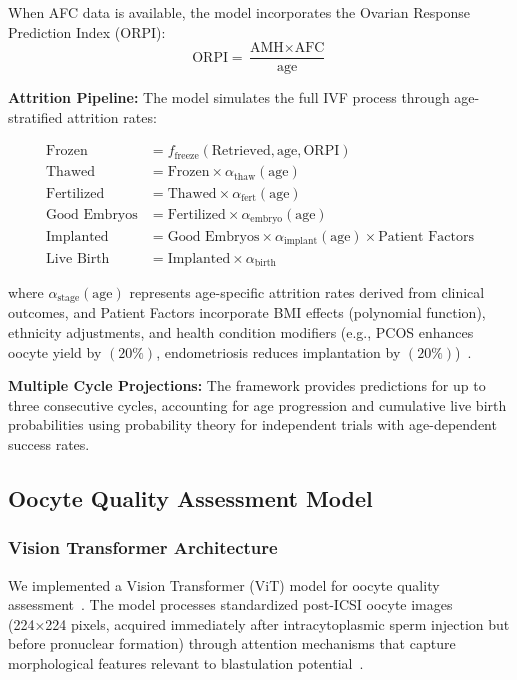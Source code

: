 \documentclass[pdflatex,sn-basic]{sn-jnl}%
\begin{document}
When AFC data is available, the model incorporates the Ovarian Response Prediction Index (ORPI):
\begin{equation}
\text{ORPI} = \frac{\text{AMH} \times \text{AFC}}{\text{age}}
\end{equation}

\textbf{Attrition Pipeline:}
The model simulates the full IVF process through age-stratified attrition rates:

\begin{align}
\text{Frozen} &= f_{\text{freeze}}(\text{Retrieved}, \text{age}, \text{ORPI}) \\
\text{Thawed} &= \text{Frozen} \times \alpha_{\text{thaw}}(\text{age}) \\
\text{Fertilized} &= \text{Thawed} \times \alpha_{\text{fert}}(\text{age}) \\
\text{Good Embryos} &= \text{Fertilized} \times \alpha_{\text{embryo}}(\text{age}) \\
\text{Implanted} &= \text{Good Embryos} \times \alpha_{\text{implant}}(\text{age}) \times \text{Patient Factors} \\
\text{Live Birth} &= \text{Implanted} \times \alpha_{\text{birth}}
\end{align}

where $\alpha_{\text{stage}}(\text{age})$ represents age-specific attrition rates derived from clinical outcomes, and Patient Factors incorporate BMI effects (polynomial function), ethnicity adjustments, and health condition modifiers (e.g., PCOS enhances oocyte yield by $(20\%)$, endometriosis reduces implantation by $(20\%)$)~\cite{lee2017amh}.

\textbf{Multiple Cycle Projections:}
The framework provides predictions for up to three consecutive cycles, accounting for age progression and cumulative live birth probabilities using probability theory for independent trials with age-dependent success rates.

\subsection{Oocyte Quality Assessment Model}\label{subsec:quality}

\subsubsection{Vision Transformer Architecture}

We implemented a Vision Transformer (ViT) model for oocyte quality assessment~\cite{dosovitskiy2021image,alhammuri2023vision}. The model processes standardized post-ICSI oocyte images (224×224 pixels, acquired immediately after intracytoplasmic sperm injection but before pronuclear formation) through attention mechanisms that capture morphological features relevant to blastulation potential~\cite{zhang2021machine}.
\end{document}
